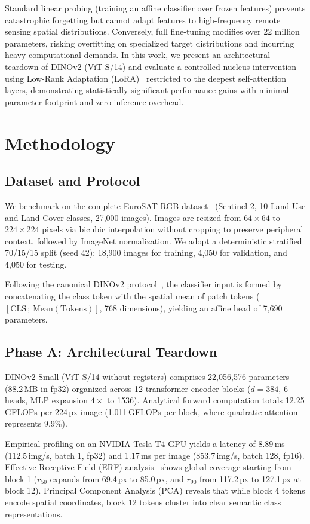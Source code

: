 \documentclass[conference,a4paper]{IEEEtran}
\begin{document}
Standard linear probing (training an affine classifier over frozen features) prevents catastrophic forgetting but cannot adapt features to high-frequency remote sensing spatial distributions. Conversely, full fine-tuning modifies over 22 million parameters, risking overfitting on specialized target distributions and incurring heavy computational demands. In this work, we present an architectural teardown of DINOv2 (ViT-S/14) and evaluate a controlled nucleus intervention using Low-Rank Adaptation (LoRA)~\cite{hu2021lora} restricted to the deepest self-attention layers, demonstrating statistically significant performance gains with minimal parameter footprint and zero inference overhead.

\section{Methodology}
\subsection{Dataset and Protocol}
We benchmark on the complete EuroSAT RGB dataset~\cite{helber2019eurosat} (Sentinel-2, 10 Land Use and Land Cover classes, 27,000 images). Images are resized from $64 \times 64$ to $224 \times 224$ pixels via bicubic interpolation without cropping to preserve peripheral context, followed by ImageNet normalization. We adopt a deterministic stratified 70/15/15 split (seed 42): 18,900 images for training, 4,050 for validation, and 4,050 for testing. 

Following the canonical DINOv2 protocol~\cite{oquab2023dinov2}, the classifier input is formed by concatenating the class token with the spatial mean of patch tokens ($[\text{CLS} \,;\, \text{Mean}(\text{Tokens})]$, 768 dimensions), yielding an affine head of 7,690 parameters.

\subsection{Phase A: Architectural Teardown}
DINOv2-Small (ViT-S/14 without registers) comprises 22,056,576 parameters (88.2\,MB in fp32) organized across 12 transformer encoder blocks ($d=384$, 6 heads, MLP expansion $4\times$ to 1536). Analytical forward computation totals 12.25\,GFLOPs per 224\,px image (1.011\,GFLOPs per block, where quadratic attention represents 9.9\%). 

Empirical profiling on an NVIDIA Tesla T4 GPU yields a latency of 8.89\,ms (112.5\,img/s, batch 1, fp32) and 1.17\,ms per image (853.7\,img/s, batch 128, fp16). Effective Receptive Field (ERF) analysis~\cite{luo2016understanding} shows global coverage starting from block 1 ($r_{50}$ expands from 69.4\,px to 85.0\,px, and $r_{90}$ from 117.2\,px to 127.1\,px at block 12). Principal Component Analysis (PCA) reveals that while block 4 tokens encode spatial coordinates, block 12 tokens cluster into clear semantic class representations.
\end{document}
